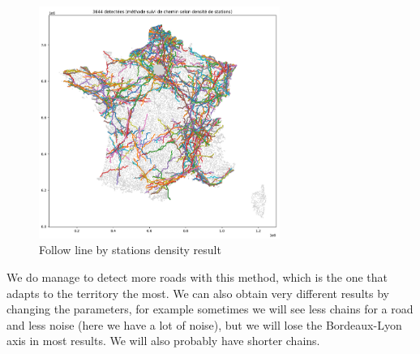 \documentclass[main.tex]{subfiles}
\begin{document}
\begin{figure}[H]
    \centering
    \includegraphics[width=0.7\textwidth]{Images/Res_Followline_Dens.png}
    \caption{Follow line by stations density result}
\end{figure}

We do manage to detect more roads with this method, which is the one that adapts to the territory the most. We can also obtain very different results by changing the parameters, for example sometimes we will see less chains for a road and less noise (here we have a lot of noise), but we will lose the Bordeaux-Lyon axis in most results. We will also probably have shorter chains. 
\end{document}
